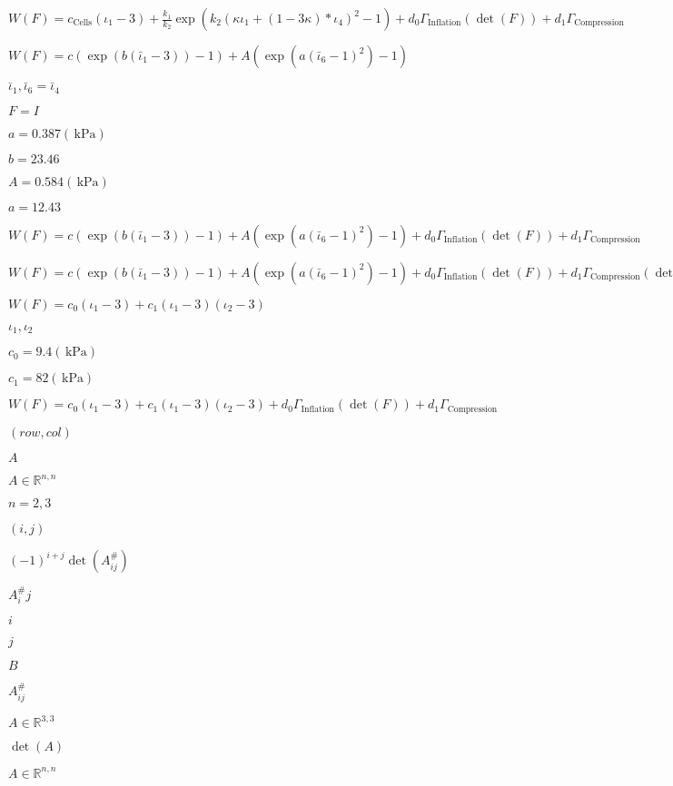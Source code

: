 \documentclass{article}
\begin{document}
$ W(F)= c_\mathrm{Cells}(\iota_1-3) + \frac{k_1}{k_2}\exp(k_2(\kappa\iota_1+(1-3\kappa)*\iota_4)^2-1) + d_0\Gamma_\mathrm{Inflation}(\det(F)) + d_1\Gamma_\mathrm{Compression} $
\pagebreak

$ W(F)=c(\exp(b(\bar\iota_1-3))-1) + A(\exp(a(\bar\iota_6-1)^2)-1) $
\pagebreak

$\bar\iota_1,\bar\iota_6=\bar\iota_4$
\pagebreak

$F=I$
\pagebreak

$a=0.387 (\,\mathrm{kPa})$
\pagebreak

$ b = 23.46 $
\pagebreak

$ A = 0.584 (\,\mathrm{kPa}) $
\pagebreak

$ a = 12.43$
\pagebreak

$ W(F)=c(\exp(b(\bar\iota_1-3))-1) + A(\exp(a(\bar\iota_6-1)^2)-1) + d_0\Gamma_\mathrm{Inflation}(\det(F)) + d_1\Gamma_\mathrm{Compression} $
\pagebreak

$ W(F)=c(\exp(b(\bar\iota_1-3))-1) + A(\exp(a(\bar\iota_6-1)^2)-1) + d_0\Gamma_\mathrm{Inflation}(\det(F)) + d_1\Gamma_\mathrm{Compression}(\det(F))$
\pagebreak

$W(F)=c_0(\iota_1-3) + c_1(\iota_1-3)(\iota_2-3)$
\pagebreak

$\iota_1,\iota_2$
\pagebreak

$c_0=9.4 (\,\mathrm{kPa})$
\pagebreak

$ c_1 = 82 (\,\mathrm{kPa}) $
\pagebreak

$W(F)=c_0(\iota_1-3) + c_1(\iota_1-3)(\iota_2-3) + d_0\Gamma_\mathrm{Inflation}(\det(F)) + d_1\Gamma_\mathrm{Compression}$
\pagebreak

$(row,col)$
\pagebreak

$ A $
\pagebreak

$ A\in \mathbb{R}^{n,n} $
\pagebreak

$ n=2,3 $
\pagebreak

$(i,j)$
\pagebreak

$ (-1)^{i+j} \det(A^\#_{ij}) $
\pagebreak

$ A^\#_ij $
\pagebreak

$i$
\pagebreak

$ j $
\pagebreak

$ B $
\pagebreak

$ A^\#_{ij} $
\pagebreak

$ A\in \mathbb{R}^{3,3} $
\pagebreak

$\det(A)$
\pagebreak

$ A\in\mathbb{R}^{n,n} $
\pagebreak
\end{document}
